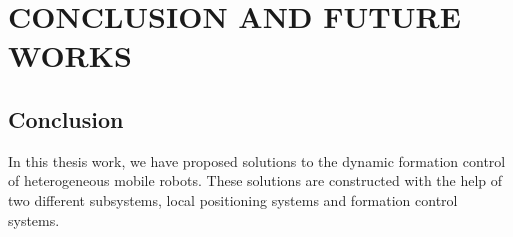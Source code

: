 

\chapter{CONCLUSION AND FUTURE WORKS}
\label{chp:conclusion}








	
\section{Conclusion}
In this thesis work, we have proposed solutions to the dynamic formation control of heterogeneous mobile robots. These solutions are constructed with the help of two different subsystems, local positioning systems and formation control systems. 

